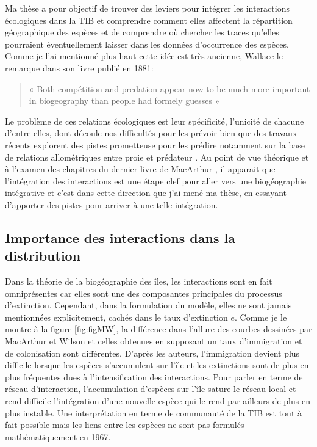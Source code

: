 Ma thèse a pour objectif de trouver des leviers pour intégrer les
interactions écologiques dans la TIB et comprendre comment elles
affectent la répartition géographique des espèces et de comprendre où
chercher les traces qu'elles pourraient éventuellement laisser dans les
données d'occurrence des espèces. Comme je l'ai mentionné plus haut
cette idée est très ancienne, Wallace le remarque dans son livre publié
en 1881:

\begin{quote}
« Both compétition and predation appear now to be much more important in
biogeography than people had formely guesses »
\end{quote}

Le problème de ces relations écologiques est leur spécificité, l'unicité
de chacune d'entre elles, dont découle nos difficultés pour les prévoir
bien que des travaux récents explorent des pistes prometteuse pour les
prédire notamment sur la base de relations allométriques entre proie et
prédateur \citep{Gravel2013a}. Au point de vue théorique et à l'examen
des chapitres du dernier livre de MacArthur
\citep{macarthur1972geographical}, il apparait que l'intégration des
interactions est une étape clef pour aller vers une biogéographie
intégrative et c'est dans cette direction que j'ai mené ma thèse, en
essayant d'apporter des pistes pour arriver à une telle intégration.

\subsection*{Importance des interactions dans la
distribution}\label{importance-des-interactions-dans-la-distribution}

Dans la théorie de la biogéographie des îles, les interactions sont en
fait omniprésentes car elles sont une des composantes principales du
processus d'extinction. Cependant, dans la formulation du modèle, elles
ne sont jamais mentionnées explicitement, cachés dans le taux
d'extinction \(e\). Comme je le montre à la figure \ref{fig:figMW}, la
différence dans l'allure des courbes dessinées par MacArthur et Wilson
et celles obtenues en supposant un taux d'immigration et de colonisation
sont différentes. D'après les auteurs, l'immigration devient plus
difficile lorsque les espèces s'accumulent sur l'île et les extinctions
sont de plus en plus fréquentes dues à l'intensification des
interactions. Pour parler en terme de réseau d'interaction,
l'accumulation d'espèces sur l'île sature le réseau local et rend
difficile l'intégration d'une nouvelle espèce qui le rend par ailleurs
de plus en plus instable. Une interprétation en terme de communauté de
la TIB est tout à fait possible mais les liens entre les espèces ne sont
pas formulés mathématiquement en 1967.

